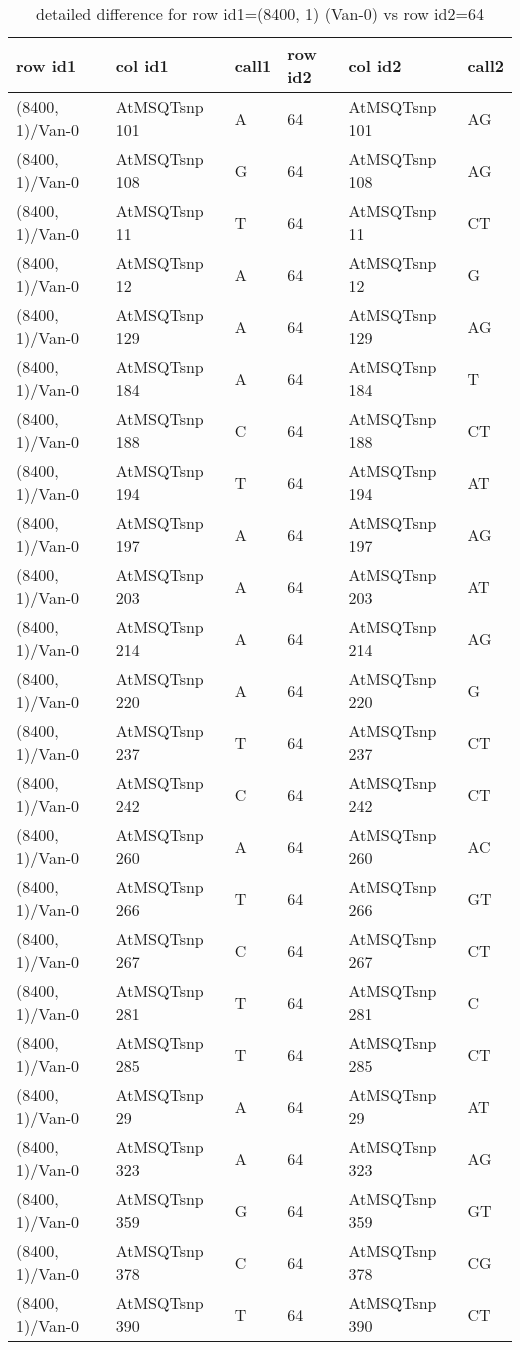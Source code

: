 \begin{center}
\begin{longtable}{|l|l|l|l|l|l|}
\caption{detailed difference for row id1=(8400, 1) (Van-0) vs row id2=64} \label{table_dm657}\\
\hline
row id1&col id1&call1&row id2&col id2&call2\\
\hline
(8400, 1)/Van-0&AtMSQTsnp 101&A&64&AtMSQTsnp 101&AG\\
(8400, 1)/Van-0&AtMSQTsnp 108&G&64&AtMSQTsnp 108&AG\\
(8400, 1)/Van-0&AtMSQTsnp 11&T&64&AtMSQTsnp 11&CT\\
(8400, 1)/Van-0&AtMSQTsnp 12&A&64&AtMSQTsnp 12&G\\
(8400, 1)/Van-0&AtMSQTsnp 129&A&64&AtMSQTsnp 129&AG\\
(8400, 1)/Van-0&AtMSQTsnp 184&A&64&AtMSQTsnp 184&T\\
(8400, 1)/Van-0&AtMSQTsnp 188&C&64&AtMSQTsnp 188&CT\\
(8400, 1)/Van-0&AtMSQTsnp 194&T&64&AtMSQTsnp 194&AT\\
(8400, 1)/Van-0&AtMSQTsnp 197&A&64&AtMSQTsnp 197&AG\\
(8400, 1)/Van-0&AtMSQTsnp 203&A&64&AtMSQTsnp 203&AT\\
(8400, 1)/Van-0&AtMSQTsnp 214&A&64&AtMSQTsnp 214&AG\\
(8400, 1)/Van-0&AtMSQTsnp 220&A&64&AtMSQTsnp 220&G\\
(8400, 1)/Van-0&AtMSQTsnp 237&T&64&AtMSQTsnp 237&CT\\
(8400, 1)/Van-0&AtMSQTsnp 242&C&64&AtMSQTsnp 242&CT\\
(8400, 1)/Van-0&AtMSQTsnp 260&A&64&AtMSQTsnp 260&AC\\
(8400, 1)/Van-0&AtMSQTsnp 266&T&64&AtMSQTsnp 266&GT\\
(8400, 1)/Van-0&AtMSQTsnp 267&C&64&AtMSQTsnp 267&CT\\
(8400, 1)/Van-0&AtMSQTsnp 281&T&64&AtMSQTsnp 281&C\\
(8400, 1)/Van-0&AtMSQTsnp 285&T&64&AtMSQTsnp 285&CT\\
(8400, 1)/Van-0&AtMSQTsnp 29&A&64&AtMSQTsnp 29&AT\\
(8400, 1)/Van-0&AtMSQTsnp 323&A&64&AtMSQTsnp 323&AG\\
(8400, 1)/Van-0&AtMSQTsnp 359&G&64&AtMSQTsnp 359&GT\\
(8400, 1)/Van-0&AtMSQTsnp 378&C&64&AtMSQTsnp 378&CG\\
(8400, 1)/Van-0&AtMSQTsnp 390&T&64&AtMSQTsnp 390&CT\\

\end{longtable}
\end{center}
